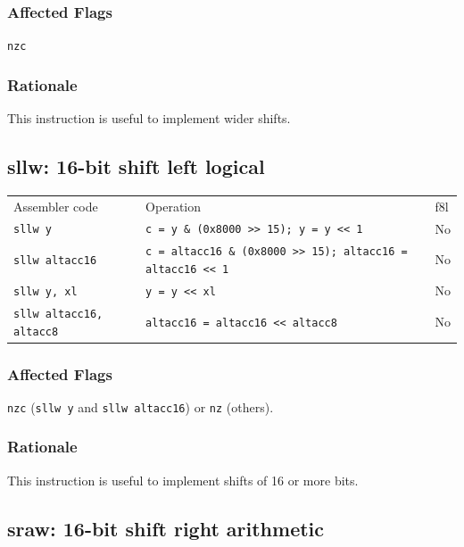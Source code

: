 \documentclass{book}
\begin{document}
\subsubsection*{Affected Flags}

\texttt{nzc}

\subsubsection*{Rationale}

This instruction is useful to implement wider shifts.


\subsection{sllw: 16-bit shift left logical}

\begin{tabular}{l l l}
Assembler code                  & Operation                                     & f8l \\
\texttt{sllw y}                 & \texttt{c = y \& (0x8000 >> 15); y = y << 1}  & No \\
\texttt{sllw altacc16}          & \texttt{c = altacc16 \& (0x8000 >> 15); altacc16 = altacc16 << 1}             & No \\
\texttt{sllw y, xl}             & \texttt{y = y << xl}                          & No \\
\texttt{sllw altacc16, altacc8} & \texttt{altacc16 = altacc16 << altacc8}       & No \\
\end{tabular}

\subsubsection*{Affected Flags}

\texttt{nzc} (\texttt{sllw y} and \texttt{sllw altacc16}) or \texttt{nz} (others).

\subsubsection*{Rationale}

This instruction is useful to implement shifts of 16 or more bits.


\subsection{sraw: 16-bit shift right arithmetic}
\end{document}
